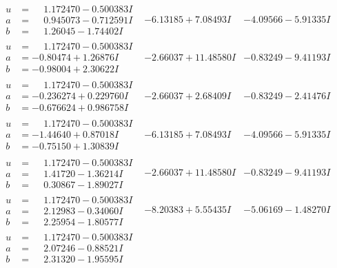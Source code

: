 \documentclass[1p]{elsarticle_modified}
\theoremstyle{definition}
\begin{document}
$$\begin{array}{c|c|c}
\begin{aligned}
u &= \phantom{-}1.172470 - 0.500383 I \\
a &= \phantom{-}0.945073 - 0.712591 I \\
b &= \phantom{-}1.26045 - 1.74402 I\end{aligned}
 & -6.13185 + 7.08493 I & -4.09566 - 5.91335 I \\ \hline\begin{aligned}
u &= \phantom{-}1.172470 - 0.500383 I \\
a &= -0.80474 + 1.26876 I \\
b &= -0.98004 + 2.30622 I\end{aligned}
 & -2.66037 + 11.48580 I & -0.83249 - 9.41193 I \\ \hline\begin{aligned}
u &= \phantom{-}1.172470 - 0.500383 I \\
a &= -0.236274 + 0.229760 I \\
b &= -0.676624 + 0.986758 I\end{aligned}
 & -2.66037 + 2.68409 I & -0.83249 - 2.41476 I \\ \hline\begin{aligned}
u &= \phantom{-}1.172470 - 0.500383 I \\
a &= -1.44640 + 0.87018 I \\
b &= -0.75150 + 1.30839 I\end{aligned}
 & -6.13185 + 7.08493 I & -4.09566 - 5.91335 I \\ \hline\begin{aligned}
u &= \phantom{-}1.172470 - 0.500383 I \\
a &= \phantom{-}1.41720 - 1.36214 I \\
b &= \phantom{-}0.30867 - 1.89027 I\end{aligned}
 & -2.66037 + 11.48580 I & -0.83249 - 9.41193 I \\ \hline\begin{aligned}
u &= \phantom{-}1.172470 - 0.500383 I \\
a &= \phantom{-}2.12983 - 0.34060 I \\
b &= \phantom{-}2.25954 - 1.80577 I\end{aligned}
 & -8.20383 + 5.55435 I & -5.06169 - 1.48270 I \\ \hline\begin{aligned}
u &= \phantom{-}1.172470 - 0.500383 I \\
a &= \phantom{-}2.07246 - 0.88521 I \\
b &= \phantom{-}2.31320 - 1.95595 I\end{aligned}

\end{array}$$
\end{document}
